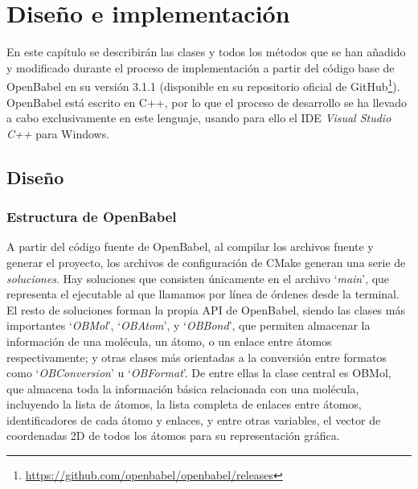 \chapter{Diseño e implementación}

En este capítulo se describirán las clases y todos los métodos que se han añadido y modificado durante el proceso de implementación a partir del código base de OpenBabel en su versión 3.1.1 (disponible en su repositorio oficial de GitHub\footnote{\url{https://github.com/openbabel/openbabel/releases}}). OpenBabel está escrito en C++, por lo que el proceso de desarrollo se ha llevado a cabo exclusivamente en este lenguaje, usando para ello el IDE \textit{Visual Studio C++} para Windows.


\section{Diseño}

\subsection{Estructura de OpenBabel}

A partir del código fuente de OpenBabel, al compilar los archivos fuente y generar el proyecto, los archivos de configuración de CMake generan una serie de \emph{soluciones}. Hay soluciones que consisten únicamente en el archivo `\textit{main}', que representa el ejecutable al que llamamos por línea de órdenes desde la terminal. El resto de soluciones forman la propia API de OpenBabel, siendo las clases más importantes `\textit{OBMol}', `\textit{OBAtom}', y `\textit{OBBond}', que permiten almacenar la información de una molécula, un átomo, o un enlace entre átomos respectivamente; y otras clases más orientadas a la conversión entre formatos como `\textit{OBConversion}' u `\textit{OBFormat}'. De entre ellas la clase central es OBMol, que almacena toda la información básica relacionada con una molécula, incluyendo la lista de átomos, la lista completa de enlaces entre átomos, identificadores de cada átomo y enlaces, y entre otras variables, el vector de coordenadas 2D de todos los átomos para su representación gráfica.

